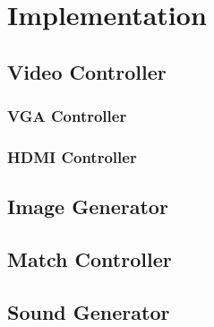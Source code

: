 \section{Implementation}
	\subsection{Video Controller}
        \subsubsection{VGA Controller}
        \subsubsection{HDMI Controller}
    \subsection{Image Generator}
    \subsection{Match Controller}
    \subsection{Sound Generator}
